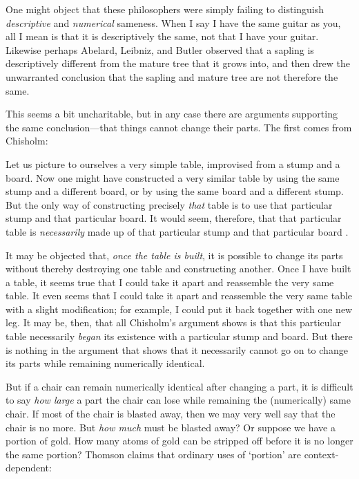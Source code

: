 \documentclass[12pt,twoside]{reedfancy}
\newenvironment{squote}{%
	\begin{spacing}{1}
	\begin{list}{}{%
	\setlength{\labelwidth}{0pt}%
	\rightmargin\leftmargin%
	}
	\item\relax
	}{%
	\end{list}%
	\end{spacing}
	}
\begin{document}
\begin{spacing}{1.25}
One might object that these philosophers were simply failing to
distinguish {\em descriptive} and {\em numerical} sameness.  When I
say I have the same guitar as you, all I mean is that it is
descriptively the same, not that I have your guitar.  Likewise perhaps
Abelard, Leibniz, and Butler observed that a sapling is descriptively
different from the mature tree that it grows into, and then drew the
unwarranted conclusion that the sapling and mature tree are not
therefore the same.

This seems a bit uncharitable, but in any case there are arguments
supporting the same conclusion---that things cannot change their
parts.  The first comes from Chisholm:

\begin{squote}
Let us picture to ourselves a very simple table, improvised from a
stump and a board.  Now one might have constructed a very similar
table by using the same stump and a different board, or by using the
same board and a different stump.  But the only way of constructing
precisely {\em that} table is to use that particular stump and that
particular board.  It would seem, therefore, that that particular
table is {\em necessarily} made up of that particular stump and that
particular board \citeyearpar[146]{chisholm1979}.
\end{squote}

It may be objected that, {\em once the table is built}, it is possible
to change its parts without thereby destroying one table and
constructing another.  Once I have built a table, it seems true that I
could take it apart and reassemble the very same table.  It even seems
that I could take it apart and reassemble the very same table with a
slight modification; for example, I could put it back together with
one new leg.  It may be, then, that all Chisholm's argument shows is
that this particular table necessarily {\em began} its existence with
a particular stump and board.  But there is nothing in the argument
that shows that it necessarily cannot go on to change its parts while
remaining numerically identical.

But if a chair can remain numerically identical after changing a part,
it is difficult to say {\em how large} a part the chair can lose while
remaining the (numerically) same chair.  If most of the chair is
blasted away, then we may very well say that the chair is no more.
But {\em how much} must be blasted away?  Or suppose we have a portion
of gold.  How many atoms of gold can be stripped off before it is no
longer the same portion?  Thomson claims that ordinary uses of
`portion' are context-dependent:


\end{spacing}
\end{document}
